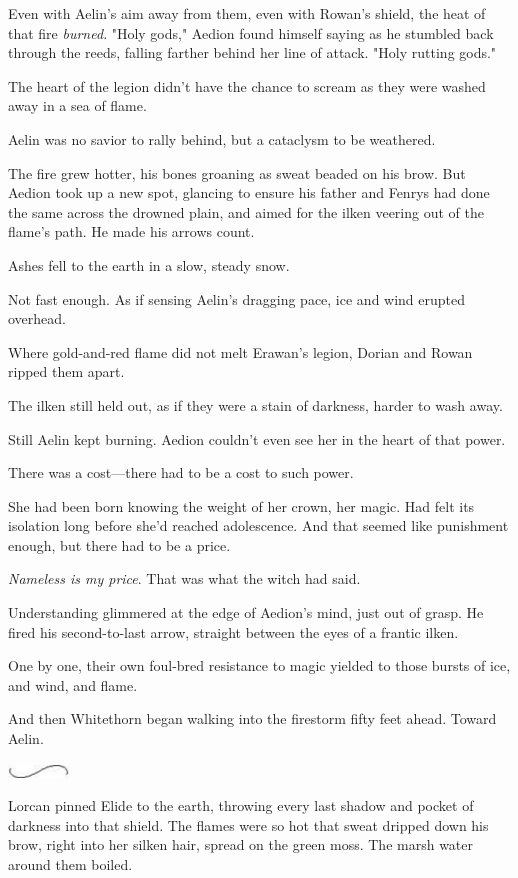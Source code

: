Even with Aelin's aim away from them, even with Rowan's shield, the heat of that fire \emph{burned}. "Holy gods," Aedion found himself saying as he stumbled back through the reeds, falling farther behind her line of attack. "Holy rutting gods."

The heart of the legion didn't have the chance to scream as they were washed away in a sea of flame.

Aelin was no savior to rally behind, but a cataclysm to be weathered.

The fire grew hotter, his bones groaning as sweat beaded on his brow. But Aedion took up a new spot, glancing to ensure his father and Fenrys had done the same across the drowned plain, and aimed for the ilken veering out of the flame's path. He made his arrows count.

Ashes fell to the earth in a slow, steady snow.

Not fast enough. As if sensing Aelin's dragging pace, ice and wind erupted overhead.

Where gold-and-red flame did not melt Erawan's legion, Dorian and Rowan ripped them apart.

The ilken still held out, as if they were a stain of darkness, harder to wash away.

Still Aelin kept burning. Aedion couldn't even see her in the heart of that power.

There was a cost---there had to be a cost to such power.

She had been born knowing the weight of her crown, her magic. Had felt its isolation long before she'd reached adolescence. And that seemed like punishment enough, but  there had to be a price.

\emph{Nameless is my price}. That was what the witch had said.

Understanding glimmered at the edge of Aedion's mind, just out of grasp. He fired his second-to-last arrow, straight between the eyes of a frantic ilken.

One by one, their own foul-bred resistance to magic yielded to those bursts of ice, and wind, and flame.

And then Whitethorn began walking into the firestorm fifty feet ahead. Toward Aelin.

\includegraphics[width=0.65in,height=0.13in]{images/seperator}

Lorcan pinned Elide to the earth, throwing every last shadow and pocket of darkness into that shield. The flames were so hot that sweat dripped down his brow, right into her silken hair, spread on the green moss. The marsh water around them boiled.


